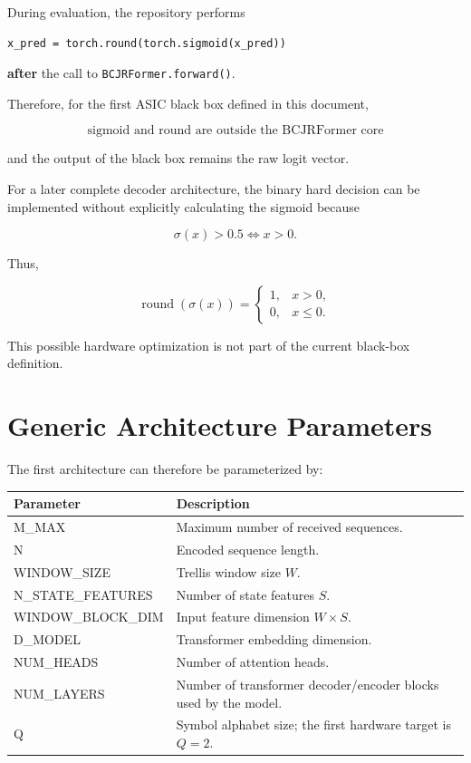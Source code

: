 \documentclass[11pt,a4paper]{article}
\begin{document}
During evaluation, the repository performs

\begin{verbatim}
x_pred = torch.round(torch.sigmoid(x_pred))
\end{verbatim}

\textbf{after} the call to \texttt{BCJRFormer.forward()}.

Therefore, for the first ASIC black box defined in this document,

\[
\boxed{\text{sigmoid and round are outside the BCJRFormer core}}
\]

and the output of the black box remains the raw logit vector.

For a later complete decoder architecture, the binary hard decision can be
implemented without explicitly calculating the sigmoid because

\[
\sigma(x) > 0.5
\iff
x > 0.
\]

Thus,

\[
\operatorname{round}(\sigma(x))
=
\begin{cases}
1, & x > 0,\\
0, & x \le 0.
\end{cases}
\]

This possible hardware optimization is not part of the current black-box
definition.

\section{Generic Architecture Parameters}

The first architecture can therefore be parameterized by:

\begin{table}[h]
\centering
\begin{tabular}{>{\ttfamily}l p{9.5cm}}
\toprule
\textnormal{Parameter} & \textnormal{Description} \\
\midrule
M\_MAX & Maximum number of received sequences. \\
N & Encoded sequence length. \\
WINDOW\_SIZE & Trellis window size $W$. \\
N\_STATE\_FEATURES & Number of state features $S$. \\
WINDOW\_BLOCK\_DIM & Input feature dimension $W \times S$. \\
D\_MODEL & Transformer embedding dimension. \\
NUM\_HEADS & Number of attention heads. \\
NUM\_LAYERS & Number of transformer decoder/encoder blocks used by the model. \\
Q & Symbol alphabet size; the first hardware target is $Q=2$. \\
\bottomrule
\end{tabular}
\end{table}
\end{document}
